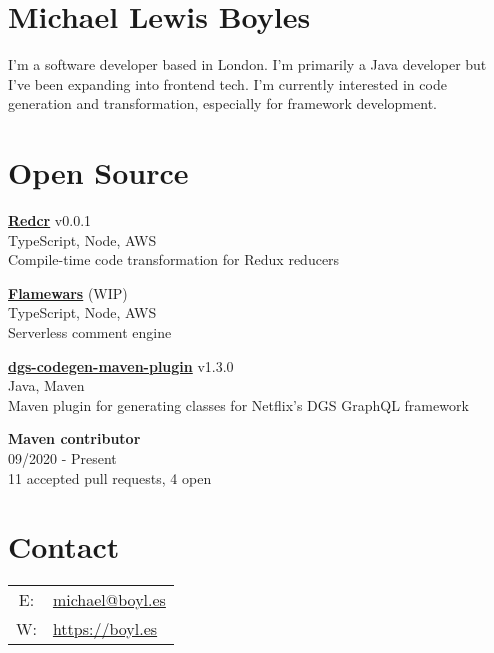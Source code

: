 \documentclass{article}
\begin{document}

\begin{minipage}[t][\textheight]{0.24\linewidth}
\raggedright
\section*{Michael Lewis Boyles}

I’m a software developer based in London. I'm primarily a Java developer but I've been expanding into frontend tech. I'm currently interested in code generation and transformation, especially for framework development.

\section*{Open Source}

\href{https://github.com/michaelboyles/redcr}{\textbf{Redcr}} v0.0.1\\
TypeScript, Node, AWS\\
\vspace{0.2cm}Compile-time code transformation for Redux reducers

\vspace{0.2cm}\href{https://github.com/michaelboyles/flamewars}{\textbf{Flamewars}} (WIP)\\
TypeScript, Node, AWS\\
\vspace{0.2cm}Serverless comment engine

\vspace{0.2cm}\href{https://github.com/michaelboyles/dgs-codegen-maven-plugin}{\textbf{dgs-codegen-maven-plugin}} v1.3.0\\
Java, Maven\\
\vspace{0.2cm}Maven plugin for generating classes for Netflix's DGS GraphQL framework

\vspace{0.2cm}\textbf{Maven contributor}\\
09/2020 - Present\\
\vspace{0.2cm}11 accepted pull requests, 4 open

\vfill
\section*{Contact}

\begin{tabular}{cl}
E: & \href{mailto:michael@boyl.es}{michael@boyl.es} \\
W: & \href{https://boyl.es}{https://boyl.es} \\
\end{tabular}

\end{minipage}
\end{document}
